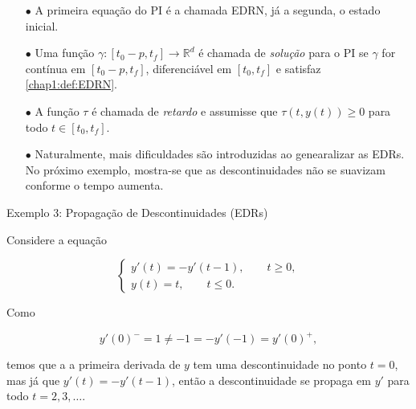 \documentclass{beamer}
\newcommand{\R}{\mathbb{R}}
\theoremstyle{plain}
\theoremstyle{definition}
\begin{document}
\begin{frame}
    \begin{itemize}
        \item[$\bullet$] A primeira equação do PI é a chamada EDRN, já a segunda, o estado inicial.
        \item[$\bullet$] Uma função $\gamma:[t_0 - p, t_f] \to \R^d$ é chamada de \textit{solução} para o PI se $\gamma$ for contínua em $[t_0 - p, t_f]$, diferenciável em $[t_0, t_f]$ e satisfaz \eqref{chap1:def:EDRN}.
        \item[$\bullet$] A função $\tau$ é chamada de \textit{retardo} e assumisse que $\tau(t, y(t))\geq0$ para todo $t \in [t_0, t_f]$.
        \item[$\bullet$] Naturalmente, mais dificuldades são introduzidas ao genearalizar as EDRs. No próximo exemplo, mostra-se que as descontinuidades não se suavizam conforme o tempo aumenta.

    \end{itemize} 
\end{frame}


\begin{frame}{Exemplo 3: Propagação de Descontinuidades (EDRs)}

     Considere a equação 

     \begin{equation}
       \begin{cases}
          y'(t) = -y'(t - 1), \qquad t \geq 0,  \\
          y(t) = t, \qquad t \leq 0.
       \end{cases}
      \label{chap1:ex5:eq:1}
     \end{equation}

     Como 

     \[
       y'(0)^- = 1 \neq -1 = - y'(-1) = y'(0)^+,
     \]
    
     \noindent
     temos que a a primeira derivada de $y$ tem uma descontinuidade no ponto $t = 0$, mas já que $y'(t) = -y'(t - 1)$, então a descontinuidade se propaga em $y'$ para todo $t = 2, 3, \dots$. 


\end{frame}

\end{document}
